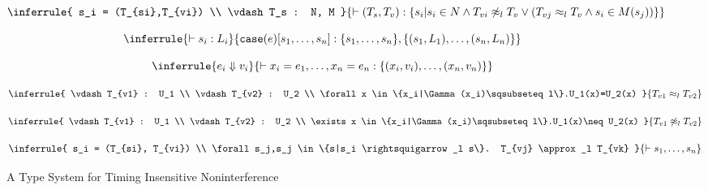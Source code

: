 \begin{figure}
\[
  \inferrule
    {
      s_i = (T_{si},T_{vi}) \\
      \vdash T_s : N, M
    }{
      \vdash (T_s, T_v) : \{s_i| s_i\in N \wedge
      T_{vi}\not\approx_l T_v
      \vee(T_{vj} \approx_l T_v \wedge s_i \in M(s_j))\}
    }
\]

\[
  \inferrule
  {
    \vdash s_i : L_i
  }{
    \mathtt{case}(e)[s_1,\ldots,s_n] :
    \{s_1,\ldots,s_n\},\{(s_1,L_1),\ldots,(s_n,L_n)\}
  }
\]

\[
  \inferrule
  {
    e_i \Downarrow v_i
  }{
    \vdash x_i=e_1,\ldots,x_n=e_n :
    \{(x_i,v_i),\ldots,(x_n,v_n)\}
  }
\]

\[
  \inferrule
  {
    \vdash T_{v1} : U_1 \\ \vdash T_{v2} : U_2 \\ 
    \forall x \in \{x_i|\Gamma(x_i)\sqsubseteq l\}.U_1(x)=U_2(x)
  }{
    T_{v1} \approx_l T_{v2}
  }
\]

\[
  \inferrule
  {
    \vdash T_{v1} : U_1 \\ \vdash T_{v2} : U_2 \\
    \exists x \in \{x_i|\Gamma(x_i)\sqsubseteq l\}.U_1(x)\neq U_2(x)
  }{
    T_{v1} \not\approx_l T_{v2}
  }
\]

\[
  \inferrule
  {
    s_i = (T_{si}, T_{vi}) \\
    \forall s_j,s_j \in \{s|s_i \rightsquigarrow_l s\}. T_{vj} \approx_l T_{vk}
  }{
    \vdash s_1,\ldots,s_n
  }
\]

\label{fig:types}
\caption{A Type System for Timing Insensitive Noninterference}
\end{figure}

